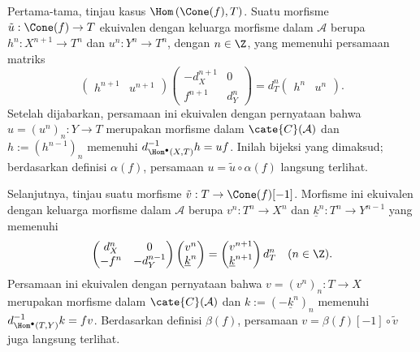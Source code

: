 \begin{bukti}
	Pertama-tama, tinjau kasus $\Hom\left(\Cone(f),T\right)$. Suatu morfisme
	$\tilde{u}:\Cone(f)\to T$ ekuivalen dengan keluarga morfisme dalam
	$\mathcal{A}$ berupa $h^n:X^{n+1}\to T^n$ dan $u^n:Y^n\to T^n$, dengan
	$n\in\Z$, yang memenuhi persamaan matriks
	\[\begin{pmatrix}
		h^{n+1} & u^{n+1}
	\end{pmatrix} \begin{pmatrix}
		-d_X^{n+1} & 0 \\
		f^{n+1} & d_Y^n
	\end{pmatrix} = d_T^n \begin{pmatrix}
		h^n & u^n
	\end{pmatrix}. \]
	Setelah dijabarkan, persamaan ini ekuivalen dengan pernyataan bahwa
	$u=(u^n)_n:Y\to T$ merupakan morfisme dalam $\cate{C}(\mathcal{A})$ dan
	$h:=(h^{n-1})_n$ memenuhi
	$d_{\Hom^\bullet(X,T)}^{-1}h=uf$. Inilah bijeksi yang dimaksud; berdasarkan
	definisi $\alpha(f)$, persamaan $u=\tilde{u}\circ\alpha(f)$ langsung
	terlihat.

	Selanjutnya, tinjau suatu morfisme
	$\tilde{v}:T\to\Cone(f)[-1]$. Morfisme ini ekuivalen dengan keluarga
	morfisme dalam $\mathcal{A}$ berupa $v^n:T^n\to X^n$ dan
	$\underline{k}^n:T^n\to Y^{n-1}$ yang memenuhi
	\[\begin{pmatrix}
		d_X^n & 0 \\
		-f^n & -d_Y^{n-1}
	\end{pmatrix} \begin{pmatrix}
		v^n \\ \underline{k}^n
	\end{pmatrix} = \begin{pmatrix}
		v^{n+1} \\ \underline{k}^{n+1}
	\end{pmatrix} d_T^n
	\quad (n \in \Z). \]
	Persamaan ini ekuivalen dengan pernyataan bahwa
	$v=(v^n)_n:T\to X$ merupakan morfisme dalam $\cate{C}(\mathcal{A})$ dan
	$k:=(-\underline{k}^n)_n$ memenuhi
	$d_{\Hom^\bullet(T,Y)}^{-1}k=fv$. Berdasarkan definisi $\beta(f)$,
	persamaan $v=\beta(f)[-1]\circ\tilde{v}$ juga langsung terlihat.
\end{bukti}

